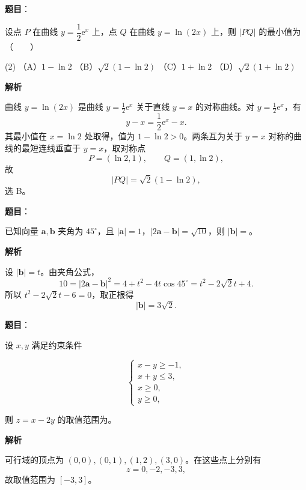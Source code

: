 \begin{answer}

\textbf{题目}：

设点 $P$ 在曲线 $y=\dfrac12\mathrm e^x$ 上，点 $Q$ 在曲线 $y=\ln(2x)$ 上，则 $|PQ|$ 的最小值为\mbox{（　　）}

\begin{gkopts}(2)
\task （A）$1-\ln2$
\task （B）$\sqrt2(1-\ln2)$
\task （C）$1+\ln2$
\task （D）$\sqrt2(1+\ln2)$
\end{gkopts}

\textbf{解析}

曲线 $y=\ln(2x)$ 是曲线 $y=\frac12\mathrm e^x$ 关于直线 $y=x$ 的对称曲线。对 $y=\frac12\mathrm e^x$，有
\nopagebreak[4]
\[
y-x=\frac12\mathrm e^x-x.
\]
其最小值在 $x=\ln2$ 处取得，值为 $1-\ln2>0$。两条互为关于 $y=x$ 对称的曲线的最短连线垂直于 $y=x$，取对称点
\nopagebreak[4]
\[
P=(\ln2,1),\qquad Q=(1,\ln2),
\]
故
\nopagebreak[4]
\[
|PQ|=\sqrt2(1-\ln2),
\]
选 B。


\end{answer}
\begin{answer}

\textbf{题目}：

已知向量 $\boldsymbol a,\boldsymbol b$ 夹角为 $45^\circ$，且 $|\boldsymbol a|=1$，$|2\boldsymbol a-\boldsymbol b|=\sqrt{10}$，则 $|\boldsymbol b|=$\gkblank{}。

\textbf{解析}

设 $|\boldsymbol b|=t$。由夹角公式，
\nopagebreak[4]
\[
10=|2\boldsymbol a-\boldsymbol b|^2
=4+t^2-4t\cos45^\circ
=t^2-2\sqrt2t+4.
\]
所以 $t^2-2\sqrt2t-6=0$，取正根得
\nopagebreak[4]
\[
|\boldsymbol b|=3\sqrt2.
\]


\end{answer}
\begin{answer}

\textbf{题目}：

设 $x,y$ 满足约束条件

\nopagebreak[4]
\[
\begin{cases}
x-y\geqslant-1,\\
x+y\leqslant3,\\
x\geqslant0,\\
y\geqslant0,
\end{cases}
\]

则 $z=x-2y$ 的取值范围为\gkblank{}。

\textbf{解析}

可行域的顶点为 $(0,0),(0,1),(1,2),(3,0)$。在这些点上分别有
\nopagebreak[4]
\[
z=0,-2,-3,3,
\]
故取值范围为 $[-3,3]$。


\end{answer}
